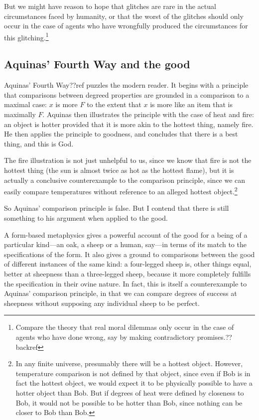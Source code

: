 But we might have reason to hope that glitches are rare in the actual circumstances faced by humanity, or that the worst of the
glitches should only occur in the case of agents who have wrongfully produced the circumstances for this glitching.\footnote{Compare the theory that real moral
dilemmas only occur in the case of agents who have done wrong, say by making contradictory promises.??backref} 

\subsection{Aquinas' Fourth Way and the good}
Aquinas' Fourth Way??ref puzzles the modern reader. It begins with a principle that comparisons between
degreed properties are grounded in a comparison to a maximal case: $x$ is more $F$ to the extent that $x$ is more 
like an item that is maximally $F$. Aquinas then illustrates the principle with the case of heat and fire:
an object is hotter provided that it is more akin to the hottest thing, namely fire. He then applies
the principle to goodness, and concludes that there is a best thing, and this is God.

The fire illustration is not just unhelpful to us, since we know that fire is not the hottest thing (the sun is almost
twice as hot as the hottest flame), but it is actually a conclusive counterexample to the comparison principle,
since we can easily compare temperatures without reference to an alleged hottest object.\footnote{In any finite universe,
presumably there will be a hottest object. However, temperature comparison is not defined by that object, since 
even if Bob is in fact the hottest object, we would expect it to be physically possible to have a hotter object 
than Bob. But if degrees of heat were defined by closeness to Bob, it would not be possible to be hotter than
Bob, since nothing can be closer to Bob than Bob.}

So Aquinas' comparison principle is false. But I contend that there is still something to his argument
when applied to the good. 

A form-based metaphysics gives a powerful account of the good for a being of
a particular kind---an oak, a sheep or a human, say---in terms of its match to the specifications of the
form. It also gives a ground to comparisons between the good of different instances of the same kind:
a four-legged sheep is, other things equal, better at sheepness than a three-legged sheep, because it
more completely fulfills the specification in their ovine nature. In fact, this is itself a counterexample 
to Aquinas' comparison principle, in that we can compare degrees of success at sheepness without supposing
any individual sheep to be perfect.

